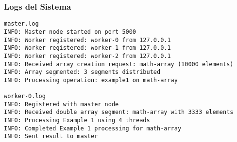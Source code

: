\documentclass{beamer}
\begin{document}
\begin{frame}[fragile]
\frametitle{Logs del Sistema}
\begin{lstlisting}[style=terminal]
master.log
INFO: Master node started on port 5000
INFO: Worker registered: worker-0 from 127.0.0.1
INFO: Worker registered: worker-1 from 127.0.0.1
INFO: Worker registered: worker-2 from 127.0.0.1
INFO: Received array creation request: math-array (10000 elements)
INFO: Array segmented: 3 segments distributed
INFO: Processing operation: example1 on math-array

worker-0.log
INFO: Registered with master node
INFO: Received double array segment: math-array with 3333 elements
INFO: Processing Example 1 using 4 threads
INFO: Completed Example 1 processing for math-array
INFO: Sent result to master
\end{lstlisting}
\end{frame}
\end{document}
